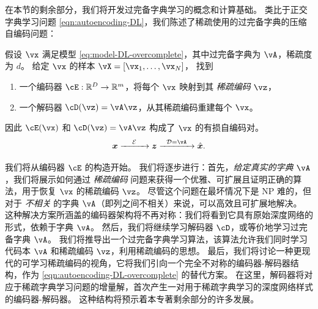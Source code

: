 \documentclass[../../book-main.tex]{subfiles}
\begin{document}
在本节的剩余部分，我们将开发过完备字典学习的概念和计算基础。
类比于正交字典学习问题 \eqref{eqn:autoencoding-DL}，我们陈述了稀疏使用的过完备字典的压缩自编码问题：
\begin{tcolorbox}
    假设 $\vx$ 满足模型 \eqref{eq:model-DL-overcomplete}，其中过完备字典为 $\vA$，稀疏度为 $d$。
    给定 $\vx$ 的样本 $\vX = [\vx_1, \dots, \vx_N]$，
    找到
    \begin{enumerate}[left=0pt, label=\arabic*.]
        \item 一个编码器 $\cE : \R^D \to \R^m$，将每个 $\vx$ 映射到其 \textit{稀疏编码} $\vz$，
        \item 一个解码器 $\cD(\vz) = \vA \vz$，从其稀疏编码重建每个 $\vx$。
    \end{enumerate}
    因此
    $\cE(\vx)$ 和 $\cD(\vz) = \vA \vz$ 构成了 $\vx$ 的有损自编码对。
\begin{equation}
\x \xrightarrow{\hspace{4mm} \mathcal{E} \hspace{4mm}}  \z \xrightarrow{\hspace{2mm} \mathcal{D} = \vA \hspace{2mm}}   \hat{\x}.  
\label{eqn:autoencoding-DL-overcomplete}
\end{equation}    
\end{tcolorbox}
我们将从编码器 $\cE$ 的构造开始。
我们将逐步进行：首先，\textit{给定真实的字典 $\vA$}，我们将展示如何通过 \textit{稀疏编码} 问题来获得一个优雅、可扩展且证明正确的算法，用于恢复 $\vx$ 的稀疏编码 $\vz$。
尽管这个问题在最坏情况下是 NP 难的，但对于 \textit{不相关} 的字典 $\vA$（即列之间不相关）来说，可以高效且可扩展地解决。
这种解决方案所涵盖的编码器架构将不再对称：我们将看到它具有原始深度网络的形式，依赖于字典 $\vA$。
然后，我们将继续学习解码器 $\cD$，或等价地学习过完备字典 $\vA$。
我们将推导出一个过完备字典学习算法，该算法允许我们同时学习代码本 $\vA$ 和稀疏编码 $\vz$，利用稀疏编码的思想。
最后，我们将讨论一种更现代的可学习稀疏编码的视角，它将我们引向一个完全不对称的编码器-解码器结构，作为 \eqref{eqn:autoencoding-DL-overcomplete} 的替代方案。
在这里，解码器将对应于稀疏字典学习问题的增量解，首次产生一对用于稀疏字典学习的深度网络样式的编码器-解码器。
这种结构将预示着本专著剩余部分的许多发展。

\end{document}
